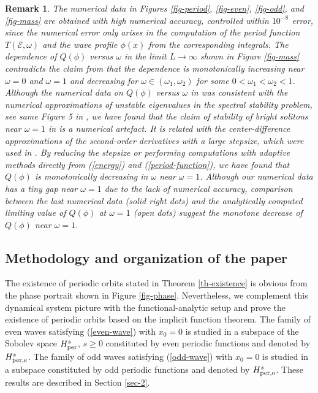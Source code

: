 \documentclass[12pt,reqno]{amsart}
\numberwithin{equation}{section}
\numberwithin{figure}{section}
\newtheorem{remark}[theorem]{Remark}
\begin{document}
\begin{remark}
	\label{rem-data}
	The numerical data in Figures \ref{fig-period}, \ref{fig-even}, \ref{fig-odd}, and \ref{fig-mass} are obtained with high numerical accuracy, controlled within 
	$10^{-8}$ error, since the numerical error only arises in the computation of the period function $T(\mathcal{E},\omega)$ and the wave profile $\phi(x)$ from the corresponding integrals. The dependence of $Q(\phi)$ versus $\omega$ in the limit 
	$L \to \infty$ shown in Figure \ref{fig-mass} contradicts 
	the claim from \cite[Figure 5]{KPR24} that the dependence is monotonically increasing near $\omega = 0$ and $\omega = 1$ and decreasing for $\omega \in (\omega_1,\omega_2)$ for some $0 < \omega_1 < \omega_2 < 1$. Although the numerical data on $Q(\phi)$ versus $\omega$ in \cite{KPR24} was consistent with the numerical approximations of unstable eigenvalues in the spectral stability problem, see same Figure 5 in \cite{KPR24}, we have found that the claim 
	of stability of bright solitons near $\omega = 1$ in \cite{KPR24} is a numerical artefact. It is related with the center-difference approximations of the second-order derivatives with a large stepsize, which were used in \cite{KPR24}. By reducing the stepsize or performing computations with adaptive methods directly from (\ref{energy}) and (\ref{period-function}), we have found that $Q(\phi)$ is monotonically decreasing in $\omega$ near $\omega = 1$. Although our numerical data has a tiny gap near $\omega = 1$ due to the lack of numerical accuracy, comparison between the last numerical data (solid right dots) and the analytically computed limiting value of $Q(\phi)$ at $\omega = 1$ (open dots) suggest the monotone decrease of $Q(\phi)$ near $\omega = 1$.
\end{remark}


	
	
\subsection{Methodology and organization of the paper}
	
The existence of periodic orbits stated in Theorem \ref{th-existence} is obvious from the phase portrait shown in Figure \ref{fig-phase}. 
Nevertheless, we complement this dynamical system picture with the functional-analytic setup and prove the existence of periodic orbits based on the implicit function theorem. The family of even waves satisfying (\ref{even-wave}) 
with $x_0 = 0$ is studied in a subspace of the Sobolev space $H_{\rm per}^s$, $s \geq 0$ constituted by even periodic functions and denoted by $H_{\rm per,e}^s$. The family of odd waves satisfying (\ref{odd-wave}) with $x_0 = 0$ is studied in a subspace constituted by odd periodic functions and denoted by $H_{\rm per,o}^s$. These results are described in Section \ref{sec-2}.
\end{document}
